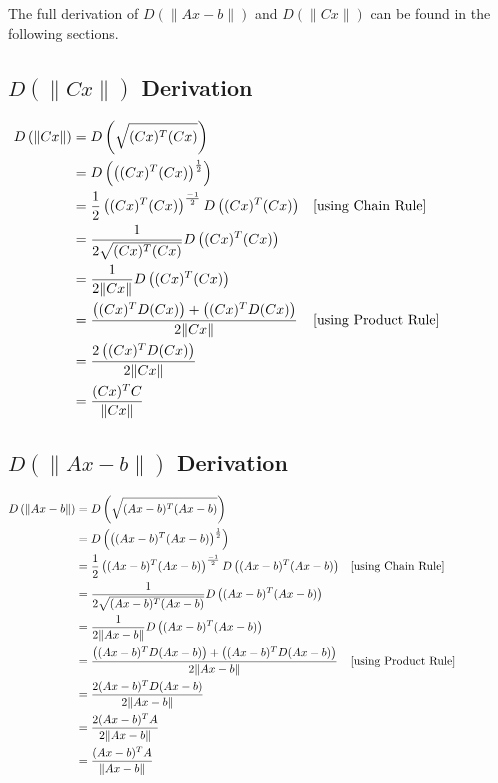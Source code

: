 \documentclass{article}
\begin{document}
    The full derivation of $D \left( \| Ax - b \| \right)$ and $ D \left( \| Cx \| \right) $ can be found in the following sections.

    \subsection{ $D \left(\| Cx \| \right)$ Derivation }

    \begin{align*}
        D\left( \| Cx \| \right) &= D \left( \sqrt{(Cx)^T (Cx)} \right) \\
        &= D \left( \left( (Cx)^T (Cx) \right)^\frac{1}{2} \right) \\
        &= \frac{1}{2} \left( (Cx)^T (Cx) \right)^\frac{-1}{2} D \left( (Cx)^T (Cx) \right) & \parbox[c]{0.4\linewidth}{[using Chain Rule]}\\
        &= \frac{1}{2 \sqrt{ (Cx)^T (Cx) } }  D \left( (Cx)^T (Cx) \right) \\
        &= \frac{1}{2 \| Cx \| }  D \left( (Cx)^T (Cx) \right) \\
        &= \frac{\left( (Cx)^T D(Cx) \right) + \left( (Cx)^T D(Cx) \right) }{2 \| Cx \| } & \parbox[c]{0.4\linewidth}{[using Product Rule]}\\
        &= \frac{2 \left( (Cx)^T D(Cx) \right)}{2 \| Cx \| } \\
        &= \frac{(Cx)^T C}{ \| Cx \| }
    \end{align*}

    \subsection{ $D \left( \| Ax-b \| \right)$ Derivation}

    \begin{align*}
        D\left( \| Ax-b \| \right) &= D \left( \sqrt{(Ax-b)^T (Ax-b)} \right) \\
        &= D \left( \left( (Ax-b)^T (Ax-b) \right)^{\frac{1}{2}} \right) \\
        &= \frac{1}{2} \left((Ax-b)^T (Ax-b) \right)^{\frac{-1}{2}} D \left( (Ax-b)^T (Ax-b) \right) & \parbox[c]{0.4\linewidth}{[using Chain Rule]} \\
        &= \frac{1}{2 \sqrt { (Ax-b)^T (Ax-b) }} D \left( (Ax-b)^T (Ax-b) \right) \\
        &= \frac{1}{2 \| Ax-b \| } D \left( (Ax-b)^T (Ax-b) \right) \\
        &= \frac{ \left( (Ax-b)^T D(Ax-b) \right) + \left( (Ax-b)^T D(Ax-b) \right) }{2 \| Ax-b \| } & \parbox[c]{0.4\linewidth}{[using Product Rule]} \\
        &= \frac{ 2(Ax-b)^T D(Ax-b) }{2 \| Ax-b \| } \\
        &= \frac{ 2(Ax-b)^T A }{2 \| Ax-b \| } \\
        &= \frac{ (Ax-b)^T A }{\| Ax-b \| }
    \end{align*}
\end{document}
